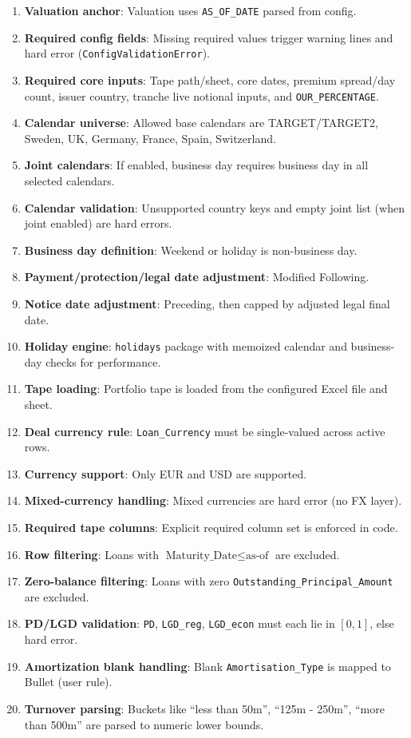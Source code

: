\documentclass[11pt]{article}
\begin{document}
\begin{enumerate}[label=\arabic*),leftmargin=*,align=left]

\item \textbf{Valuation anchor}: Valuation uses \texttt{AS\_OF\_DATE} parsed from config.
\item \textbf{Required config fields}: Missing required values trigger warning lines and hard error (\texttt{ConfigValidationError}).
\item \textbf{Required core inputs}: Tape path/sheet, core dates, premium spread/day count, issuer country, tranche live notional inputs, and \texttt{OUR\_PERCENTAGE}.
\item \textbf{Calendar universe}: Allowed base calendars are TARGET/TARGET2, Sweden, UK, Germany, France, Spain, Switzerland.
\item \textbf{Joint calendars}: If enabled, business day requires business day in all selected calendars.
\item \textbf{Calendar validation}: Unsupported country keys and empty joint list (when joint enabled) are hard errors.
\item \textbf{Business day definition}: Weekend or holiday is non-business day.
\item \textbf{Payment/protection/legal date adjustment}: Modified Following.
\item \textbf{Notice date adjustment}: Preceding, then capped by adjusted legal final date.
\item \textbf{Holiday engine}: \texttt{holidays} package with memoized calendar and business-day checks for performance.

\item \textbf{Tape loading}: Portfolio tape is loaded from the configured Excel file and sheet.
\item \textbf{Deal currency rule}: \texttt{Loan\_Currency} must be single-valued across active rows.
\item \textbf{Currency support}: Only EUR and USD are supported.
\item \textbf{Mixed-currency handling}: Mixed currencies are hard error (no FX layer).
\item \textbf{Required tape columns}: Explicit required column set is enforced in code.
\item \textbf{Row filtering}: Loans with \(\text{Maturity\_Date} \le \text{as-of}\) are excluded.
\item \textbf{Zero-balance filtering}: Loans with zero \texttt{Outstanding\_Principal\_Amount} are excluded.
\item \textbf{PD/LGD validation}: \texttt{PD}, \texttt{LGD\_reg}, \texttt{LGD\_econ} must each lie in \([0,1]\), else hard error.
\item \textbf{Amortization blank handling}: Blank \texttt{Amortisation\_Type} is mapped to Bullet (user rule).
\item \textbf{Turnover parsing}: Buckets like ``less than 50m'', ``125m - 250m'', ``more than 500m'' are parsed to numeric lower bounds.


\end{enumerate}
\end{document}
